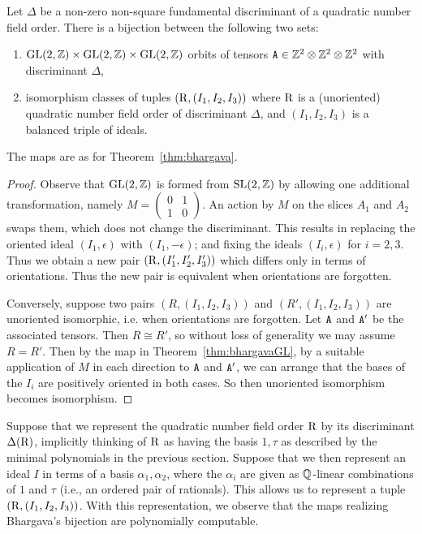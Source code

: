 \begin{theorem}
	\label{thm:bhargavaGL}
	Let $\Delta$ be a non-zero non-square fundamental discriminant of a quadratic number field order.
There is a bijection between the following two sets:
\begin{enumerate}
	\item $\mathrm{GL}(2,\mathbb{Z}) \times \mathrm{GL}(2,\mathbb{Z}) \times \mathrm{GL}(2,\mathbb{Z})$ orbits of tensors $\mathtt{A} \in \mathbb{Z}^2 \otimes \mathbb{Z}^2 \otimes \mathbb{Z}^2$ with discriminant $\Delta$,
	\item isomorphism classes of tuples $(\mathrm{R}, (I_1, I_2, I_3))$ where $\mathrm{R}$ is a (unoriented) quadratic number field order of discriminant $\Delta$, and $(I_1,I_2,I_3)$ is a balanced triple of ideals.
\end{enumerate}
	The maps are as for Theorem~\ref{thm:bhargava}.
\end{theorem}

	\begin{proof}
	Observe that $\mathrm{GL}(2,\mathbb{Z})$ is formed from $\mathrm{SL}(2,\mathbb{Z})$ by allowing one additional transformation, namely $M = \begin{pmatrix} 0 & 1 \\ 1 & 0 \end{pmatrix}$.  An action by $M$ on the slices $A_1$ and $A_2$ swaps them, which does not change the discriminant.  This results in replacing the oriented ideal $(I_1,\epsilon)$ with $(I_1,-\epsilon)$; and fixing the ideals $(I_i,\epsilon)$ for $i=2,3$.  Thus we obtain a new pair $(\mathrm{R}, (I_1', I_2', I_3'))$ which differs only in terms of orientations.  Thus the new pair is equivalent when orientations are forgotten.  

		Conversely, suppose two pairs $(R, (I_1, I_2, I_3))$ and $(R', (I_1, I_2, I_3))$ are unoriented isomorphic, i.e. when orientations are forgotten.  Let $\mathtt{A}$ and $\mathtt{A}'$ be the associated tensors.  Then $R \cong R'$, so without loss of generality we may assume $R = R'$.  Then by the map in Theorem~\ref{thm:bhargavaGL}, by a suitable application of $M$ in each direction to $\mathtt{A}$ and $\mathtt{A}'$, we can arrange that the bases of the $I_i$ are positively oriented in both cases.  So then unoriented isomorphism becomes isomorphism.
	\end{proof}

Suppose that we represent the quadratic number field order $\mathrm{R}$ by its discriminant $\Delta(\mathrm{R})$, implicitly thinking of $\mathrm{R}$ as having the basis $1, \tau$ as described by the minimal polynomials in the previous section.
Suppose that we then represent an ideal $I$ in terms of a basis $\alpha_1, \alpha_2$, where the $\alpha_i$ are given as $\mathbb{Q}$-linear combinations of $1$ and $\tau$ (i.e., an ordered pair of rationals).  This allows us to represent a tuple $(\mathrm{R}, (I_1, I_2, I_3))$.
	With this representation, we observe that the maps realizing Bhargava's bijection are polynomially computable.


